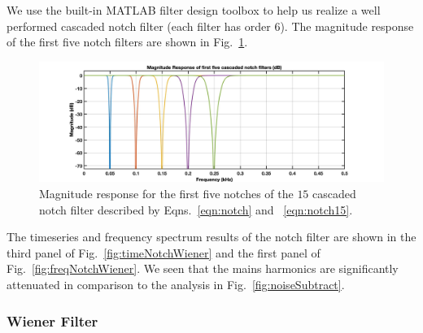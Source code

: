 \documentclass[paper-main.tex]{subfiles}
\begin{document}
We use the built-in MATLAB filter design toolbox to help us realize a well performed cascaded notch filter (each filter has order 6).  
The magnitude response of the first five notch filters are shown in Fig.~\ref{fig:notchMagResponse}. 
\begin{figure}
\begin{center}
\includegraphics[width=.49\textwidth]{figures/1111}
\end{center}
\caption{\label{fig:notchMagResponse}
Magnitude response for the first five notches of the $15$ cascaded notch filter described by Eqns.~\ref{eqn:notch} and ~\ref{eqn:notch15}. 
}
\end{figure}


The timeseries and frequency spectrum results of the notch filter are shown in the third panel of Fig.~\ref{fig:timeNotchWiener} and the first panel of Fig.~\ref{fig:freqNotchWiener}. 
We seen that the mains harmonics are significantly attenuated in comparison to the analysis in Fig.~\ref{fig:noiseSubtract}. 




\subsubsection{Wiener Filter}
\end{document}
